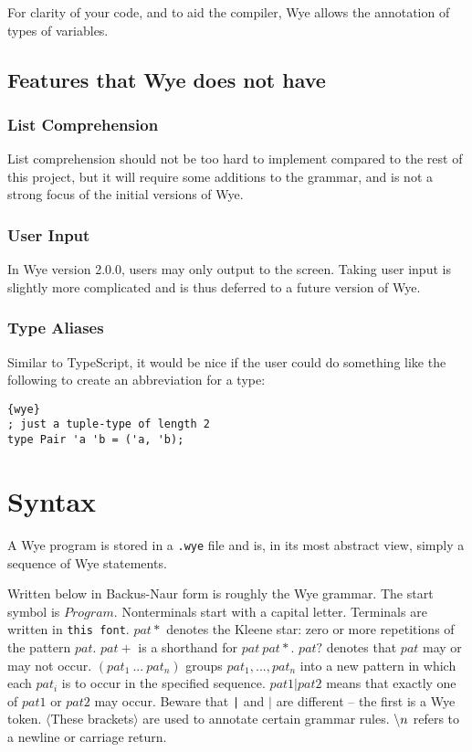 \documentclass[a4paper, 12pt]{article}
\newcommand{\version}{2.0.0}
\renewcommand{\tt}{\texttt}
\newcommand{\la}{\langle}
\newcommand{\ra}{\rangle}
\begin{document}
For clarity of your code, and to aid the compiler, Wye allows the annotation of
types of variables.

\subsection{Features that Wye does not have}

\subsubsection{List Comprehension}
List comprehension should not be too hard to implement compared to the rest of
this project, but it will require some additions to the grammar, and is not
a strong focus of the initial versions of Wye.

\subsubsection{User Input}
In Wye version \version{}, users may only output to the screen. Taking user
input is slightly more complicated and is thus deferred to a future version of
Wye.

\subsubsection{Type Aliases}
Similar to TypeScript, it would be nice if the user could do something like the
following to create an abbreviation for a type:
\begin{lstlisting}{wye}
; just a tuple-type of length 2
type Pair 'a 'b = ('a, 'b);
\end{lstlisting}

\section{Syntax}
A Wye program is stored in a \tt{.wye} file and is, in its most abstract
view, simply a sequence of Wye statements.

Written below in Backus-Naur form is roughly the Wye grammar. The start symbol is
$Program$. Nonterminals start with a capital letter. Terminals are written in
\tt{this font}. $pat*$ denotes the Kleene star: zero or more repetitions of
the pattern $pat$. $pat+$ is a shorthand for $pat\: pat*$. $pat?$ denotes that
$pat$ may or may not occur. $( pat_1\:...\: pat_n )$ groups $pat_1, ..., pat_n$
into a new pattern in which each $pat_i$ is to occur in the specified sequence.
$pat1 | pat2$ means that exactly one of $pat1$ or $pat2$ may occur. Beware that
\tt{|} and $|$ are different -- the first is a Wye token. $\la$These
brackets$\ra$ are used to annotate certain grammar rules. $\symbol{92}n$ refers
to a newline or carriage return.
\end{document}
